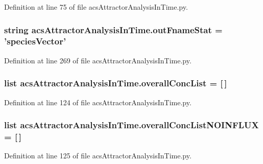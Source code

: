 Definition at line 75 of file acs\-Attractor\-Analysis\-In\-Time.\-py.

\hypertarget{a00092_a05e902a00f3333a303563029c80605de}{
\subsubsection[{out\-Fname\-Stat}]{\setlength{\rightskip}{0pt plus 5cm}string acs\-Attractor\-Analysis\-In\-Time.\-out\-Fname\-Stat = 'species\-Vector'}}\label{a00092_a05e902a00f3333a303563029c80605de}


Definition at line 269 of file acs\-Attractor\-Analysis\-In\-Time.\-py.

\hypertarget{a00092_a2cebadd75179c46e551a2facbdd2741b}{
\subsubsection[{overall\-Conc\-List}]{\setlength{\rightskip}{0pt plus 5cm}list acs\-Attractor\-Analysis\-In\-Time.\-overall\-Conc\-List = \mbox{[}$\,$\mbox{]}}}\label{a00092_a2cebadd75179c46e551a2facbdd2741b}


Definition at line 124 of file acs\-Attractor\-Analysis\-In\-Time.\-py.

\hypertarget{a00092_ad7eab833592c6cd395f9e2416dd13920}{
\subsubsection[{overall\-Conc\-List\-N\-O\-I\-N\-F\-L\-U\-X}]{\setlength{\rightskip}{0pt plus 5cm}list acs\-Attractor\-Analysis\-In\-Time.\-overall\-Conc\-List\-N\-O\-I\-N\-F\-L\-U\-X = \mbox{[}$\,$\mbox{]}}}\label{a00092_ad7eab833592c6cd395f9e2416dd13920}


Definition at line 125 of file acs\-Attractor\-Analysis\-In\-Time.\-py.


